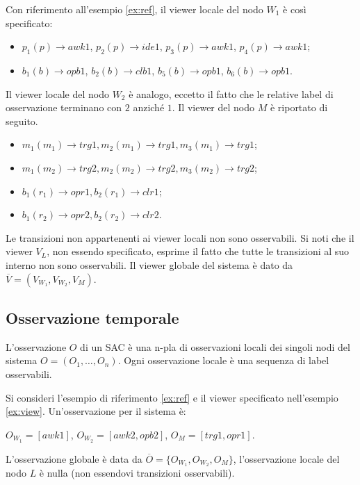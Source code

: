 \begin{ex} \label{ex:view}
Con riferimento all'esempio \ref{ex:ref}, il viewer locale del nodo $W_1$ è così specificato:
\begin{itemize}
\item $p_1(p) \rightarrow awk1$, $p_2(p) \rightarrow ide1$, $p_3(p) \rightarrow awk1$, $p_4(p) \rightarrow awk1$;
\item $b_1(b) \rightarrow opb1$, $b_2(b) \rightarrow clb1$, $b_5(b) \rightarrow opb1$, $b_6(b) \rightarrow opb1$.
\end{itemize}
Il viewer locale del nodo $W_2$ è analogo, eccetto il fatto che le relative label di osservazione terminano con $2$ anziché $1$.
Il viewer del nodo $M$ è riportato di seguito.
\begin{itemize}
\item $m_1(m_1) \rightarrow trg1, m_2(m_1) \rightarrow trg1, m_3(m_1) \rightarrow trg1$;
\item $m_1(m_2) \rightarrow trg2, m_2(m_2) \rightarrow trg2, m_3(m_2) \rightarrow trg2$;
\item $b_1(r_1) \rightarrow opr1, b_2(r_1) \rightarrow clr1$;
\item $b_1(r_2) \rightarrow opr2, b_2(r_2) \rightarrow clr2$.
\end{itemize}
Le transizioni non appartenenti ai viewer locali non sono osservabili. Si noti che il viewer $V_L$, non essendo specificato, esprime il fatto che tutte le transizioni al suo interno non sono osservabili.
Il viewer globale del sistema è dato da $\overline{V} = (V_{W_1},V_{W_2},V_M)$.
\end{ex}

\subsection{Osservazione temporale}
L'osservazione $O$ di un SAC è una n-pla di osservazioni locali dei singoli nodi del sistema $O = (O_1, \ldots, O_n)$. Ogni osservazione locale è una sequenza di label osservabili.

\begin{ex} \label{ex_osserv}
Si consideri l'esempio di riferimento \ref{ex:ref} e il viewer specificato nell'esempio \ref{ex:view}. Un'osservazione per il sistema è:
\begin{center}
$O_{W_1} = [awk1]$, $O_{W_2} = [awk2,opb2]$, $O_M = [trg1,opr1]$. 
\end{center}
L'osservazione globale è data da $\overline{O} = \{O_{W_1}, O_{W_2}, O_M\}$, l'osservazione locale del nodo $L$ è nulla (non essendovi transizioni osservabili).
\end{ex}

